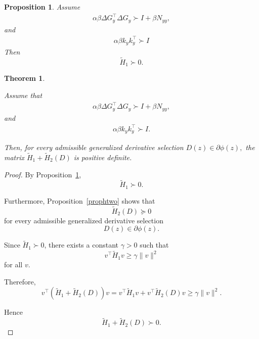 \documentclass[10pt,a4paper]{amsart}
\newtheorem{proposition}{Proposition}
\newtheorem{theorem}{Theorem}
\begin{document}
\begin{proposition}
\label{prop:H1}
Assume
\begin{align}
    \alpha\beta \Delta G_y^\top \Delta G_y \succ I+\beta N_{yy},
\end{align}
and
\begin{align}
    \alpha\beta k_yk_y^\top \succ I
\end{align}
Then
\[
\tilde H_1\succ0.
\]
\end{proposition}

\begin{theorem}
\label{thm:H1H2}

Assume that
\begin{align}
    \alpha\beta \Delta G_y^\top \Delta G_y \succ I+\beta N_{yy},
\end{align}
and
\begin{align}
    \alpha\beta k_yk_y^\top\succ I.
\end{align}

Then, for every admissible generalized derivative selection
$D(z)\in\partial\phi(z),$ the matrix $\tilde H_1+\tilde H_2(D)$ is positive definite.

\end{theorem}

\begin{proof}

By Proposition~\ref{prop:H1},
\[
\tilde H_1\succ0.
\]

Furthermore, Proposition~\ref{prophtwo} shows that
\[
\tilde H_2(D)\succeq0
\]
for every admissible generalized derivative selection
\[
D(z)\in\partial\phi(z).
\]

Since $\tilde H_1\succ0$, there exists a constant
$\gamma>0$ such that
\[
v^\top\tilde H_1v
\ge
\gamma\|v\|^2
\]
for all $v$.

Therefore,
\[
v^\top(\tilde H_1+\tilde H_2(D))v
=
v^\top\tilde H_1v
+
v^\top\tilde H_2(D)v
\ge
\gamma\|v\|^2.
\]

Hence
\[
\tilde H_1+\tilde H_2(D)\succ0.
\]


\end{proof}
\end{document}
